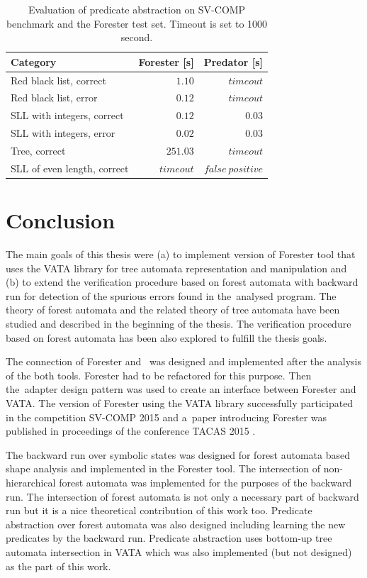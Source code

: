 \begin{table}[bt]
	\vskip6pt
	\caption{Evaluation of predicate abstraction on SV-COMP benchmark
		and the Forester test set.
		Timeout is set to 1000 second.
	}
	\centering
	\begin{tabular}{| l | r | r |}
		\hline
		Category & Forester [s] & Predator [s]  \\
		\hline
		\hline
		Red black list, correct     & $1.10$   &  $timeout$ \\
		\hline
		Red black list, error       & $0.12$   &  $timeout$ \\
		\hline
		SLL with integers, correct  & $0.12$   &  $0.03$ \\
		\hline
		SLL with integers, error    & $0.02$   &  $0.03$ \\
		\hline
		Tree, correct               & $251.03$ &  $timeout$ \\
		\hline
		SLL of even length, correct & $timeout$ & $false\ positive$ \\
		\hline
	\end{tabular}
	\label{tab:patimes}
\end{table}


\chapter{Conclusion}
\label{ch:concl}

The main goals of this thesis were (a) to implement version of Forester tool
that uses the VATA library for tree automata representation and manipulation
and (b) to extend the verification procedure based on forest automata with
backward run for detection of the spurious errors found in the~analysed program.
The theory of forest automata and the related theory of tree automata have been studied
and described in the beginning of the thesis.
The verification procedure based on forest automata
has been also explored to fulfill the thesis goals.

The connection of Forester and \vata\ was designed and implemented
after the analysis of the both tools.
Forester had to be refactored for this purpose.
Then the~adapter design pattern was used to create an interface between Forester and VATA.
The version of Forester using the VATA library successfully participated
in the competition SV-COMP 2015 \cite{www:svcomp} and a~paper introducing
Forester was published in proceedings of the conference TACAS 2015 \cite{svcomp15}.

The backward run over symbolic states was designed for forest automata based shape analysis
and implemented in the Forester tool.
The intersection of non-hierarchical forest automata was implemented for
the purposes of the backward run.
The intersection of forest automata is not only a necessary part of backward run
but it is a nice theoretical contribution of this work too.
Predicate abstraction over forest automata was also designed including learning
the new predicates by the backward run.
Predicate abstraction uses bottom-up tree automata intersection in VATA
which was also implemented (but not designed) as the part of this work.

